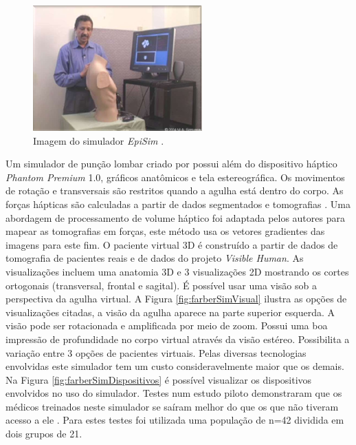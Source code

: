 \begin{figure}[ht!]
    \centering
    \includegraphics[width=0.4\linewidth]{capitulos/figuras/epiSim.png} 
    \caption{Imagem do simulador \textit{EpiSim} \cite{Frazzetto2011}.}
    \label{fig:epiSim}
\end{figure}

Um simulador de punção lombar criado por \textcite{Farber2008}  possui além do dispositivo háptico \textit{Phantom Premium} 1.0, gráficos anatômicos e tela estereográfica. Os movimentos de rotação e transversais são restritos quando a agulha está dentro do corpo. As forças hápticas são calculadas a partir de dados segmentados e tomografias \cite{Farber2008, Farber2009}. Uma abordagem de processamento de volume háptico \cite{Lundin2005} foi adaptada pelos autores para mapear as tomografias em forças, este método usa os vetores gradientes das imagens para este fim. O paciente virtual 3D é construído a partir de dados de tomografia de pacientes reais e de dados do projeto \textit{Visible Human}. As visualizações incluem uma anatomia 3D e 3 visualizações 2D mostrando os cortes ortogonais (transversal, frontal e sagital). É possível usar uma visão sob a perspectiva da agulha virtual. A Figura \ref{fig:farberSimVisual} ilustra as opções de visualizações citadas, a visão da agulha aparece na parte superior esquerda. A visão pode ser rotacionada e amplificada por meio de zoom. Possui uma boa impressão de profundidade no corpo virtual através da visão estéreo. Possibilita a variação entre 3 opções de pacientes virtuais. Pelas diversas tecnologias envolvidas este simulador tem um custo consideravelmente maior que os demais. Na Figura \ref{fig:farberSimDispositivos} é possível visualizar os dispositivos envolvidos no uso do simulador. Testes num estudo piloto demonstraram que os médicos treinados neste simulador se saíram melhor do que os que não tiveram acesso a ele \cite{Farber2009}. Para estes testes foi utilizada uma população de n=42 dividida em dois grupos de 21.


